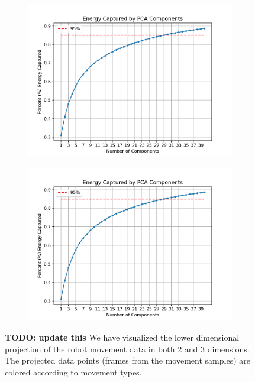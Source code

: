 \documentclass[11pt]{amsart}
\begin{document}
\begin{figure}[h]
    \centering
    \begin{subfigure}{0.4\textwidth}
        \centering
        \includegraphics[width=\textwidth]{../visualizations/energy_by_components.png}
        \label{fig:image1}
    \end{subfigure}
    \begin{subfigure}{0.4\textwidth}
        \centering
        \includegraphics[width=\textwidth]{../visualizations/energy_by_components.png}
        \label{fig:image2}
    \end{subfigure}
    \caption{ \textbf{TODO: update this} We have visualized the lower dimensional projection of the robot movement data in both 2 and 3 dimensions.
    The projected data points (frames from the movement samples) are colored according to movement types.}
    \label{fig:f1}
\end{figure}
\end{document}
